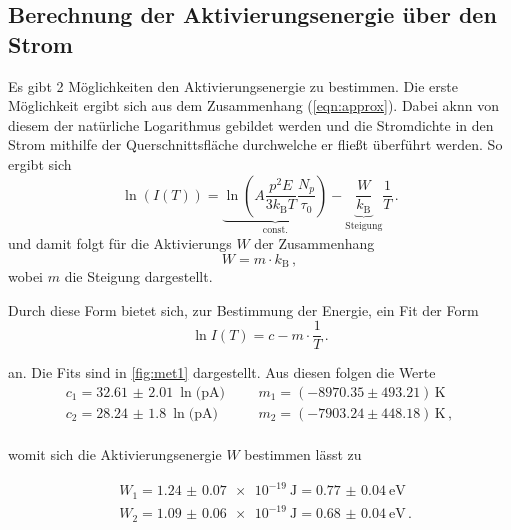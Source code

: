 \subsection{Berechnung der Aktivierungsenergie über den Strom}
Es gibt 2 Möglichkeiten den Aktivierungsenergie zu bestimmen. Die erste Möglichkeit ergibt sich aus dem Zusammenhang (\ref{eqn:approx}). Dabei aknn von diesem der natürliche
Logarithmus gebildet werden und die Stromdichte in den Strom mithilfe der Querschnittsfläche durchwelche er fließt überführt werden. So ergibt sich 
\begin{equation}
    \ln\left(I(T)\right) = \underbrace{\ln\left(A \frac{p^2E}{3 k_\text{B} T} \frac{N_p}{\tau_0}\right)}_{\text{const.}} - \underbrace{\frac{W}{k_\text{B}}}_{\text{Steigung}} \frac{1}{T} \, .
    \label{eqn:geradengleichung}
\end{equation}
und damit folgt für die Aktivierungs $W$ der Zusammenhang
\begin{equation}
    W = m \cdot k_\text{B} \, ,
    \label{eqn:Aktivierungsenergie}
\end{equation}
wobei $m$ die Steigung dargestellt.

\noindent
Durch diese Form bietet sich, zur Bestimmung der Energie, ein Fit der Form 
\begin{equation*}
  \ln{I(T)} = c - m \cdot \frac{1}{T} \, .
\end{equation*}

\noindent
an. Die Fits sind in \autoref{fig:met1} dargestellt. Aus diesen folgen die Werte
\begin{align*}
  c_1 =  \SI{32.61(201)}{\ln(\pico\ampere)}& && m_1 = (-8970.35\pm 493.21)\,\si{\kelvin} \,  \\
  c_2 =  \SI{28.24(180)}{\ln(\pico\ampere)}& && m_2 = (-7903.24\pm 448.18)\,\si{\kelvin} \, , \\
\end{align*}

\noindent
womit sich die Aktivierungsenergie $W$ bestimmen lässt zu 

\begin{align*}
  & W_{1} = \SI{1.24(7)e-19}{\joule} = \SI{0.77(4)}{\electronvolt} \,  \\
  & W_{2} = \SI{1.09(6)e-19}{\joule} = \SI{0.68(4)}{\electronvolt} \, . \\
\end{align*}


